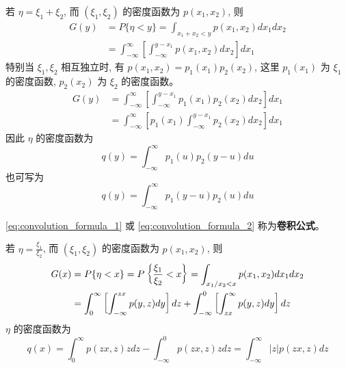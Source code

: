 \begin{example}[ 随机变量和的分布]\label{ex:随机变量和的分布}
 若 $\eta = \xi_1 + \xi_2$, 而 $(\xi_1, \xi_2)$ 的密度函数为 $p(x_1, x_2)$, 则
\begin{align*}
G(y) &= P\{\eta < y\} = \int_{x_1+x_2<y} p(x_1, x_2) dx_1 dx_2 \\
&= \int_{-\infty}^\infty \left[ \int_{-\infty}^{y-x_1} p(x_1, x_2) dx_2 \right] dx_1
\end{align*}
特别当 $\xi_1, \xi_2$ 相互独立时, 有 $p(x_1, x_2) = p_1(x_1)p_2(x_2)$, 这里 $p_1(x_1)$ 为 $\xi_1$ 的密度函数, $p_2(x_2)$ 为 $\xi_2$ 的密度函数。
\begin{align*}
G(y) &= \int_{-\infty}^\infty \left[ \int_{-\infty}^{y-x_1} p_1(x_1)p_2(x_2) dx_2 \right] dx_1 \\
&= \int_{-\infty}^\infty \left[ p_1(x_1) \int_{-\infty}^{y-x_1} p_2(x_2) dx_2 \right] dx_1
\end{align*}
因此 $\eta$ 的密度函数为
\begin{equation} \label{eq:convolution_formula_1}
q(y) = \int_{-\infty}^\infty p_1(u) p_2(y - u) du
\end{equation}
也可写为
\begin{equation} \label{eq:convolution_formula_2}
q(y) = \int_{-\infty}^\infty p_1(y - u) p_2(u) du
\end{equation}
\end{example}
\begin{remark}
    \eqref{eq:convolution_formula_1} 或 \eqref{eq:convolution_formula_2} 称为\textbf{卷积公式}。
\end{remark}

\begin{example}[ 随机变量商的分布]\label{ex:随机变量商的分布}
    若 $\eta = \frac{\xi_1}{\xi_2}$, 而 $(\xi_1, \xi_2)$ 的密度函数为 $p(x_1, x_2)$, 则
\begin{align} \label{eq:quotient_distribution_cdf}
G(x) &= P\{\eta < x\} = P\left\{\frac{\xi_1}{\xi_2} < x\right\} = \int_{x_1/x_2<x} p(x_1, x_2) dx_1 dx_2 \notag \\
&= \int_0^\infty \left[ \int_{-\infty}^{zx} p(y,z) dy \right] dz + \int_{-\infty}^0 \left[ \int_{zx}^\infty p(y,z) dy \right] dz
\end{align}
$\eta$ 的密度函数为
\begin{equation} \label{eq:quotient_distribution_pdf}
q(x) = \int_0^\infty p(zx,z)z dz - \int_{-\infty}^0 p(zx,z)z dz = \int_{-\infty}^\infty |z|p(zx,z) dz
\end{equation}
\end{example}

